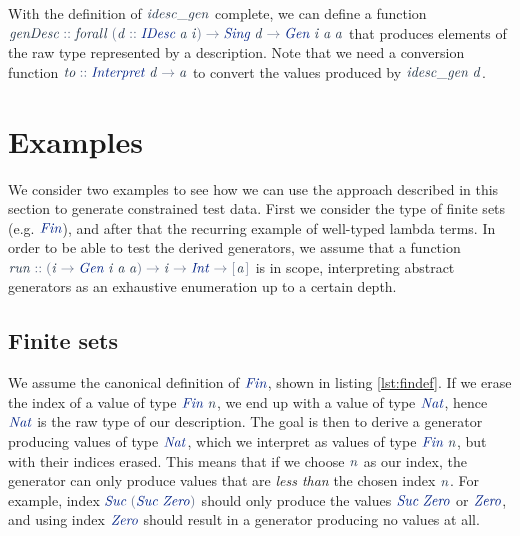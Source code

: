 \documentclass[a4paper,msc,twosized=semi]{uustthesis}
\let\oldemph\emph
\renewcommand\emph[1]{{\large\oldemph{#1}}}
\newcommand*{\mathcolor}{}
\def\mathcolor#1#{\mathcoloraux{#1}}
\newcommand*{\mathcoloraux}[3]{%
  \protect\leavevmode
  \begingroup
    \color#1{#2}#3%
  \endgroup
}
\newcommand{\HSSpecial}[1]{\mathcolor{hsblue4}{#1}}
\newcommand{\HSSym}[1]{\mathcolor{hsblue4}{#1}}
\newcommand{\HSCon}[1]{\mathcolor{hsblue3}{\mathit{#1}}}
\newcommand{\HSVar}[1]{\mathcolor{hsblue5}{\mathit{#1}}}
\begin{document}
  With the definition of \ensuremath{\HSVar{idesc\char95 gen}} complete, we can define a function \ensuremath{\HSVar{genDesc}\HSSym{::}\HSVar{forall}\;\HSSpecial{(}\HSVar{d}\HSSym{::}\HSCon{IDesc}\;\HSVar{a}\;\HSVar{i}\HSSpecial{)}\HSSym{\to} \HSCon{Sing}\;\HSVar{d}\HSSym{\to} \HSCon{Gen}\;\HSVar{i}\;\HSVar{a}\;\HSVar{a}} that produces elements of the raw 
  type represented by a description. Note that we need a conversion function \ensuremath{\HSVar{to}\HSSym{::}\HSCon{Interpret}\;\HSVar{d}\HSSym{\to} \HSVar{a}} to convert the values produced by \ensuremath{\HSVar{idesc\char95 gen}\;\HSVar{d}}. 

\section{Examples}

  We consider two examples to see how we can use the approach described in this 
  section to generate constrained test data. First we consider the type of finite sets 
  (e.g. \ensuremath{\HSCon{Fin}}), and after that the recurring example of well-typed lambda terms. In 
  order to be able to test the derived generators, we assume that a function \ensuremath{\HSVar{run}\HSSym{::}\HSSpecial{(}\HSVar{i}\HSSym{\to} \HSCon{Gen}\;\HSVar{i}\;\HSVar{a}\;\HSVar{a}\HSSpecial{)}\HSSym{\to} \HSVar{i}\HSSym{\to} \HSCon{Int}\HSSym{\to} \HSSpecial{\HSSym{[\mskip1.5mu} }\HSVar{a}\HSSpecial{\HSSym{\mskip1.5mu]}}} is in scope, interpreting abstract generators 
  as an exhaustive enumeration up to a certain depth. 

\subsection{Finite sets}

  We assume the canonical definition of \ensuremath{\HSCon{Fin}}, shown in listing \ref{lst:findef}. If we erase the index of 
  a value of type \ensuremath{\HSCon{Fin}\;\HSVar{n}}, we end up with a value of type \ensuremath{\HSCon{Nat}}, hence \ensuremath{\HSCon{Nat}} is the 
  raw type of our description. The goal is then to derive a generator producing values 
  of type \ensuremath{\HSCon{Nat}}, which we interpret as values of type \ensuremath{\HSCon{Fin}\;\HSVar{n}}, but with their indices 
  erased. This means that if we choose \ensuremath{\HSVar{n}} as our index, the generator can only 
  produce values that are \emph{less than} the chosen index \ensuremath{\HSVar{n}}. For example, index \ensuremath{\HSCon{Suc}\;\HSSpecial{(}\HSCon{Suc}\;\HSCon{Zero}\HSSpecial{)}} should only produce the values \ensuremath{\HSCon{Suc}\;\HSCon{Zero}} or \ensuremath{\HSCon{Zero}}, and using index 
  \ensuremath{\HSCon{Zero}} should result in a generator producing no values at all. 
\end{document}
